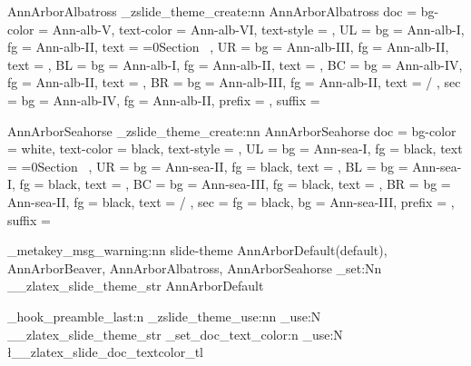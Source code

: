 {  %
  {AnnArborAlbatross}{
    \_zslide_theme_create:nn {AnnArborAlbatross}{
      doc = {
        bg-color = Ann-alb-V,
        text-color = Ann-alb-VI,
        text-style = \sfdefault
      },
      UL = {
        bg   = Ann-alb-I,
        fg   = Ann-alb-II, 
        text = {\ifnum{}=0\else Section\ \thesection\fi} 
      },
      UR = {
        bg   = Ann-alb-III,
        fg   = Ann-alb-II,
        text = {\zslideDefaultUR}
      },
      BL = {
        bg   = Ann-alb-I,
        fg   = Ann-alb-II,
        text = \zslideAuthor
      },
      BC = {
        bg   = Ann-alb-IV,
        fg   = Ann-alb-II,
        text = \zslideTitle
      },
      BR = {
        bg   = Ann-alb-III,
        fg   = Ann-alb-II,
        text = \zslideDate\quad \thepage/\pageref{zslide-last-page} 
      },
      sec = {
        bg   = Ann-alb-IV,
        fg   = Ann-alb-II,
        prefix = {},
        suffix = {}
      }
    }
  }

  {AnnArborSeahorse}{
    \_zslide_theme_create:nn {AnnArborSeahorse}{
      doc = {
        bg-color = white,
        text-color = black,
        text-style = \sfdefault
      },
      UL = {
        bg   = Ann-sea-I,
        fg   = black,
        text = {\ifnum{}=0\else Section\ \thesection\fi}
      },
      UR = {
        bg   = Ann-sea-II,
        fg   = black,
        text = {\zslideDefaultUR}
      },
      BL = {
        bg   = Ann-sea-I,
        fg   = black,
        text = \zslideAuthor
      },
      BC = {
        bg   = Ann-sea-III,
        fg   = black,
        text = \zslideTitle
      },
      BR = {
        bg   = Ann-sea-II,
        fg   = black,
        text = \zslideDate\quad \thepage/\pageref{zslide-last-page}
      },
      sec = {
        fg   = black,
        bg   = Ann-sea-III,
        prefix = {},
        suffix = {}
      }
    }
  }
}{
  \zlatex_metakey_msg_warning:nn {slide-theme}{
    AnnArborDefault(default), AnnArborBeaver, 
    AnnArborAlbatross, AnnArborSeahorse
  }
  \str_set:Nn \g__zlatex_slide_theme_str {AnnArborDefault}
}

\zlatex_hook_preamble_last:n { \pagestyle{empty} }
\_zslide_theme_use:nn { \str_use:N \g__zlatex_slide_theme_str }{}
\zslide_set_doc_text_color:n { \tl_use:N \l__zlatex_slide_doc_textcolor_tl }
\renewcommand{\familydefault}{ \tl_use:N \l__zlatex_slide_doc_textstyle_tl }